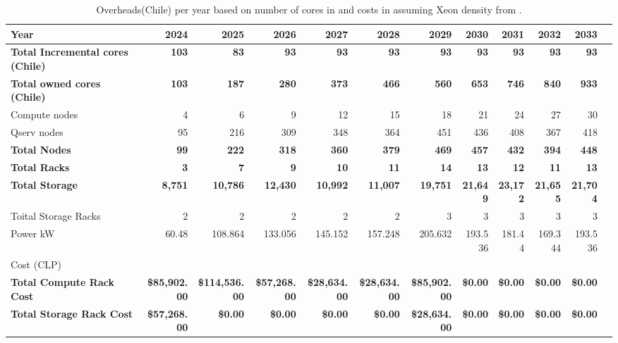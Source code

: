 \tiny \begin{longtable} { |p{}  |r  |r  |r  |r  |r  |r  |r  |r  |r  |r  |r |} 
\caption{Overheads(Chile) per year based on number of cores in  and costs in  assuming Xeon density from .  \label{tab:opsOverheadChile}}\\ 
\hline 
\textbf{Year}&\textbf{2024}&\textbf{2025}&\textbf{2026}&\textbf{2027}&\textbf{2028}&\textbf{2029}&\textbf{2030}&\textbf{2031}&\textbf{2032}&\textbf{2033} \\ \hline
\textbf{Total Incremental cores (Chile)}&\textbf{103}&\textbf{83}&\textbf{93}&\textbf{93}&\textbf{93}&\textbf{93}&\textbf{93}&\textbf{93}&\textbf{93}&\textbf{93} \\ \hline
\textbf{Total owned cores (Chile)}&\textbf{103}&\textbf{187}&\textbf{280}&\textbf{373}&\textbf{466}&\textbf{560}&\textbf{653}&\textbf{746}&\textbf{840}&\textbf{933} \\ \hline
{Compute nodes}&{4}&{6}&{9}&{12}&{15}&{18}&{21}&{24}&{27}&{30} \\ \hline
{Qserv nodes}&{95}&{216}&{309}&{348}&{364}&{451}&{436}&{408}&{367}&{418} \\ \hline
\textbf{Total Nodes}&\textbf{99}&\textbf{222}&\textbf{318}&\textbf{360}&\textbf{379}&\textbf{469}&\textbf{457}&\textbf{432}&\textbf{394}&\textbf{448} \\ \hline
\textbf{Total Racks}&\textbf{3}&\textbf{7}&\textbf{9}&\textbf{10}&\textbf{11}&\textbf{14}&\textbf{13}&\textbf{12}&\textbf{11}&\textbf{13} \\ \hline
\textbf{Total Storage}&\textbf{8,751}&\textbf{10,786}&\textbf{12,430}&\textbf{10,992}&\textbf{11,007}&\textbf{19,751}&\textbf{21,649}&\textbf{23,172}&\textbf{21,655}&\textbf{21,704} \\ \hline
{Toital Storage Racks}&{2}&{2}&{2}&{2}&{2}&{3}&{3}&{3}&{3}&{3} \\ \hline
{Power kW
}&{60.48}&{108.864}&{133.056}&{145.152}&{157.248}&{205.632}&{193.536}&{181.44}&{169.344}&{193.536} \\ \hline
{Cost (CLP)}&&&&&&&&&& \\ \hline
\textbf{Total Compute Rack Cost}&\textbf{\$85,902.00}&\textbf{\$114,536.00}&\textbf{\$57,268.00}&\textbf{\$28,634.00}&\textbf{\$28,634.00}&\textbf{\$85,902.00}&\textbf{\$0.00}&\textbf{\$0.00}&\textbf{\$0.00}&\textbf{\$0.00} \\ \hline
\textbf{Total Storage Rack Cost}&\textbf{\$57,268.00}&\textbf{\$0.00}&\textbf{\$0.00}&\textbf{\$0.00}&\textbf{\$0.00}&\textbf{\$28,634.00}&\textbf{\$0.00}&\textbf{\$0.00}&\textbf{\$0.00}&\textbf{\$0.00} \\ \hline
\end{longtable} \normalsize
